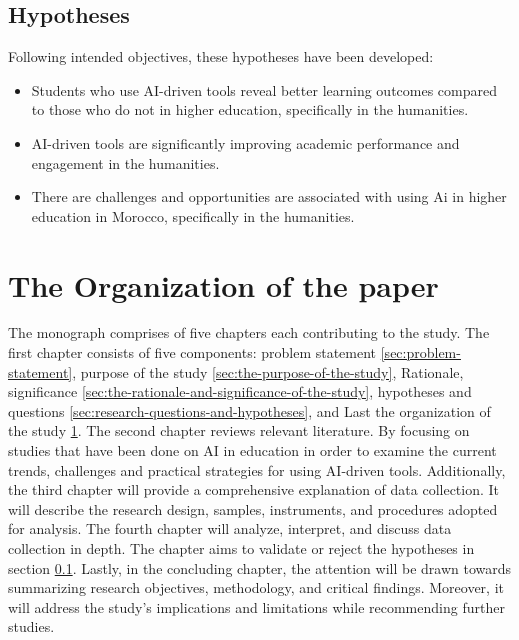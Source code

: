 \subsection{Hypotheses}\label{subsec:hypotheses}
\justifying
Following intended objectives, these hypotheses have been developed:
\begin{itemize}
      \item Students who use AI-driven tools reveal better learning outcomes
            compared to those who do not in higher education, specifically in the humanities.
      \item AI-driven tools are significantly improving academic
            performance and engagement in the humanities.
      \item There are challenges and opportunities are associated with using Ai in higher
            education in Morocco, specifically in the humanities.
\end{itemize}



\section{The Organization of the paper}\label{sec:the-organization-of-the-paper}
\justifying
The monograph comprises of five chapters each contributing to the study.
The first chapter consists of five components:
problem statement \ref*{sec:problem-statement}, purpose of the study \ref*{sec:the-purpose-of-the-study},
Rationale, significance \ref*{sec:the-rationale-and-significance-of-the-study}, hypotheses and questions
\ref*{sec:research-questions-and-hypotheses}, and Last the organization of the study \ref*{sec:the-organization-of-the-paper}.
The second chapter reviews relevant literature. By focusing on studies that have been done on AI in education in order
to examine the current trends, challenges and practical strategies for using AI-driven tools. Additionally,
the third chapter will provide a comprehensive explanation of data collection. It will describe the research
design, samples, instruments, and procedures adopted for analysis. The fourth chapter will analyze, interpret, and
discuss data collection in depth. The chapter aims to validate or reject the hypotheses in section \ref*{subsec:hypotheses}.
Lastly, in the concluding chapter, the attention will be drawn towards summarizing research objectives, methodology, and 
critical findings. Moreover, it will address the study's implications and limitations while recommending further studies.









